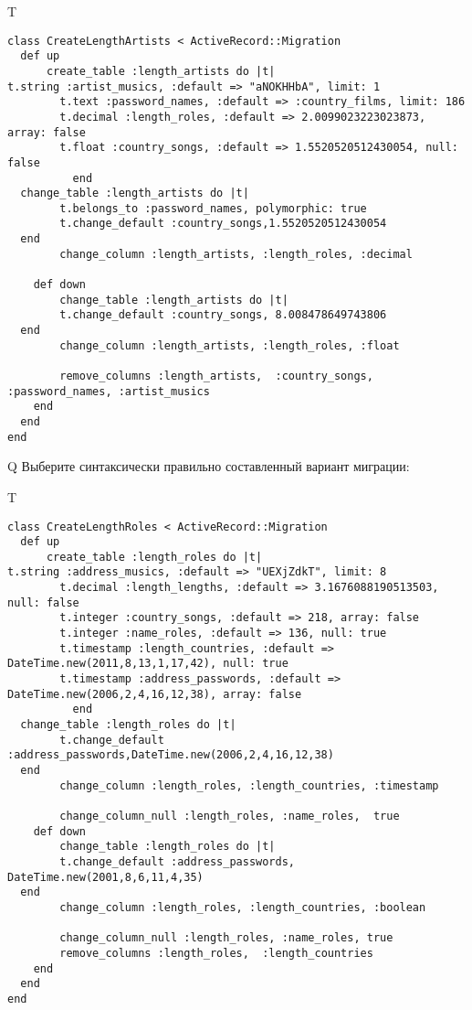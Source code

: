 T
\begin{verbatim}
class CreateLengthArtists < ActiveRecord::Migration
  def up
	  create_table :length_artists do |t|
t.string :artist_musics, :default => "aNOKHHbA", limit: 1
		t.text :password_names, :default => :country_films, limit: 186
		t.decimal :length_roles, :default => 2.0099023223023873, array: false
		t.float :country_songs, :default => 1.5520520512430054, null: false
		  end
  change_table :length_artists do |t|
		t.belongs_to :password_names, polymorphic: true
 		t.change_default :country_songs,1.5520520512430054
  end
 		change_column :length_artists, :length_roles, :decimal
   
	def down
		change_table :length_artists do |t|
		t.change_default :country_songs, 8.008478649743806
  end
 		change_column :length_artists, :length_roles, :float
   
		remove_columns :length_artists,  :country_songs, :password_names, :artist_musics 
    end 
  end
end

\end{verbatim}

Q
Выберите синтаксически правильно составленный вариант миграции:

T
\begin{verbatim}
class CreateLengthRoles < ActiveRecord::Migration
  def up
	  create_table :length_roles do |t|
t.string :address_musics, :default => "UEXjZdkT", limit: 8
		t.decimal :length_lengths, :default => 3.1676088190513503, null: false
		t.integer :country_songs, :default => 218, array: false
		t.integer :name_roles, :default => 136, null: true
		t.timestamp :length_countries, :default => DateTime.new(2011,8,13,1,17,42), null: true
		t.timestamp :address_passwords, :default => DateTime.new(2006,2,4,16,12,38), array: false
		  end
  change_table :length_roles do |t|
		t.change_default :address_passwords,DateTime.new(2006,2,4,16,12,38)
  end
 		change_column :length_roles, :length_countries, :timestamp
   
		change_column_null :length_roles, :name_roles,  true
	def down
		change_table :length_roles do |t|
		t.change_default :address_passwords, DateTime.new(2001,8,6,11,4,35)
  end
 		change_column :length_roles, :length_countries, :boolean
   
		change_column_null :length_roles, :name_roles, true
 		remove_columns :length_roles,  :length_countries 
    end 
  end
end

\end{verbatim}

